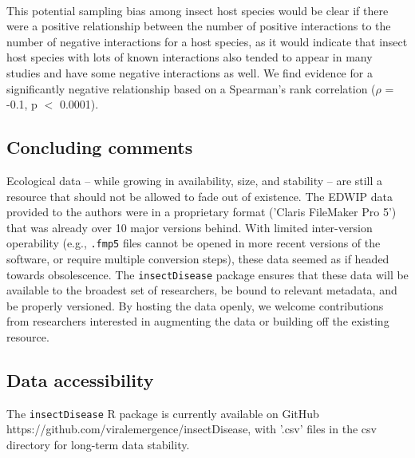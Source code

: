 \documentclass[12pt]{article}
\begin{document}
\paragraph*{}
This potential sampling bias among insect host species would be clear if there were a positive relationship between the number of positive interactions to the number of negative interactions for a host species, as it would indicate that insect host species with lots of known interactions also tended to appear in many studies and have some negative interactions as well. We find evidence for a significantly negative relationship based on a Spearman's rank correlation ($\rho$ = -0.1, p $<$ 0.0001). 





















\subsection*{Concluding comments}

Ecological data -- while growing in availability, size, and stability -- are still a resource that should not be allowed to fade out of existence. The EDWIP data provided to the authors were in a proprietary format ('Claris FileMaker Pro 5') that was already over 10 major versions behind. With limited inter-version operability (e.g., \texttt{.fmp5} files cannot be opened in more recent versions of the software, or require multiple conversion steps), these data seemed as if headed towards obsolescence. The \texttt{insectDisease} package ensures that these data will be available to the broadest set of researchers, be bound to relevant metadata, and be properly versioned. By hosting the data openly, we welcome contributions from researchers interested in augmenting the data or building off the existing resource. 







\subsection*{Data accessibility}

The \texttt{insectDisease} R package is currently available on GitHub https://github.com/viralemergence/insectDisease, with '.csv' files in the csv directory for long-term data stability. 
\end{document}
